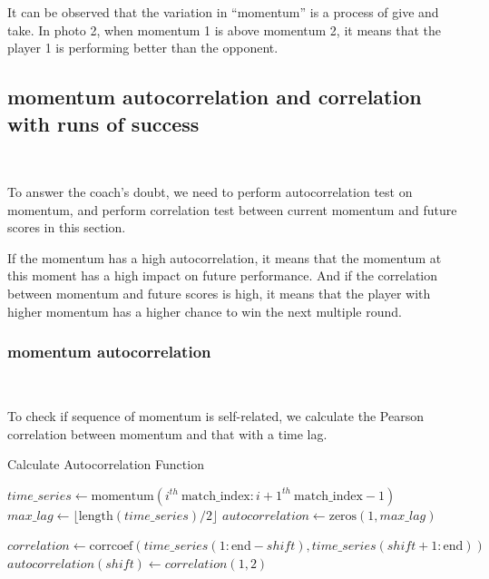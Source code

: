 It can be observed that the variation in ``momentum'' is a process of give and take.
In photo 2, when momentum 1 is above momentum 2, it means that the player 1 is performing better than the opponent. 

\subsection{momentum autocorrelation and correlation with runs of success}~{}

To answer the coach's doubt,
we need to perform autocorrelation test on momentum, 
and perform correlation test between current momentum and future scores
in this section.

If the momentum has a high autocorrelation, it means that the momentum at this moment 
has a high impact on future performance. And if the correlation between momentum and 
future scores is high, it means that the player with higher momentum has a higher
chance to win the next multiple round.

\subsubsection{momentum autocorrelation}~{}

To check if sequence of momentum is self-related, we calculate the Pearson correlation 
between momentum and that with a time lag.

\begin{algorithm}
    \caption{Calculate Autocorrelation Function}\label{alg:auto_corr}
    \begin{algorithmic}
            \State $time\_series \gets \text{momentum}(i^{th}\ \text{match\_index} : {i+1}^{th}\ \text{match\_index} - 1)$
            \State $max\_lag \gets \lfloor \text{length}(time\_series) / 2 \rfloor$ 
            \State $autocorrelation \gets \text{zeros}(1, max\_lag)$

                \State $correlation \gets \text{corrcoef}(time\_series(1 : \text{end} - shift), time\_series(shift + 1 : \text{end}))$
                \State $autocorrelation(shift) \gets correlation(1, 2)$
            \EndFor

        \EndFor
    \end{algorithmic}
\end{algorithm}

